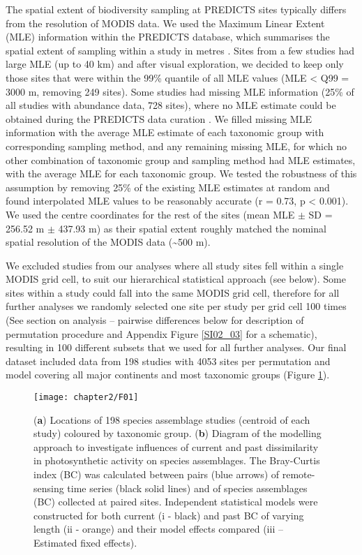 The spatial extent of biodiversity sampling at PREDICTS sites typically differs from the resolution of MODIS data. We used the Maximum Linear Extent (MLE) information within the PREDICTS database, which summarises the spatial extent of sampling within a study in metres \citep{Hudson2016}. Sites from a few studies had large MLE (up to 40 km) and after visual exploration, we decided to keep only those sites that were within the 99\% quantile of all MLE values (MLE < Q99 = 3000 m, removing 249 sites). Some studies had missing MLE information (25\% of all studies with abundance data, 728 sites), where no MLE estimate could be obtained during the PREDICTS data curation \citep{Hudson2016}. We filled missing MLE information with the average MLE estimate of each taxonomic group with corresponding sampling method, and any remaining missing MLE, for which no other combination of taxonomic group and sampling method had MLE estimates, with the average MLE for each taxonomic group. We tested the robustness of this assumption by removing 25\% of the existing MLE estimates at random and found interpolated MLE values to be reasonably accurate (r = 0.73, p < 0.001). We used the centre coordinates for the rest of the sites (mean MLE $\pm$ SD = 256.52 m $\pm$ 437.93 m) as their spatial extent roughly matched the nominal spatial resolution of the MODIS data (\textasciitilde 500 m). 

We excluded studies from our analyses where all study sites fell within a single MODIS grid cell, to suit our hierarchical statistical approach (see below). Some sites within a study could fall into the same MODIS grid cell, therefore for all further analyses we randomly selected one site per study per grid cell 100 times (See section on analysis – pairwise differences below for description of permutation procedure and Appendix Figure \ref{SI02_03} for a schematic), resulting in 100 different subsets that we used for all further analyses. Our final dataset included data from 198 studies with 4053 sites per permutation and model covering all major continents and most taxonomic groups (Figure \ref{F02_01}).

\begin{figure}[h]
\centering
\texttt{[image: chapter2/F01]}
\caption{ (\textbf{a}) Locations of 198 species assemblage studies (centroid of each study) coloured by taxonomic group. (\textbf{b}) Diagram of the modelling approach to investigate influences of current and past dissimilarity in photosynthetic activity on species assemblages. The Bray-Curtis index (BC) was calculated between pairs (blue arrows) of remote-sensing time series (black solid lines) and of species assemblages (BC) collected at paired sites. Independent statistical models were constructed for both current (i - black) and past BC of varying length (ii - orange) and their model effects compared (iii – Estimated fixed effects).}
\label{F02_01}
\end{figure}


